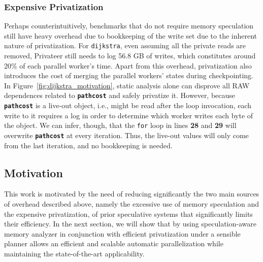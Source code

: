 \subsubsection{Expensive Privatization}
\label{sec:excessive-priv}
Perhaps counterintuitively, benchmarks that do not require memory
speculation still have heavy overhead due to bookkeeping of the write set
due to the inherent nature of privatization. For \texttt{dijkstra}, even
assuming all the private reads are removed, Privateer still needs to log
56.8 GB of writes, which constitutes around 20\% of each parallel worker's
time. Apart from this overhead, privatization also introduces the cost of
merging the parallel workers' states during checkpointing. In
Figure~\ref{fig:dijkstra_motivation}, static analysis alone can disprove
all RAW dependences related to \texttt{\textbf{pathcost}} and safely
privatize it. However, because \texttt{\textbf{pathcost}} is a live-out
object, i.e., might be read after the loop invocation, each write to it
requires a log in order to determine which worker writes each byte of the
object. We can infer, though, that the \texttt{for} loop in lines
\textbf{28} and \textbf{29} will overwrite \texttt{\textbf{pathcost}} at
every iteration. Thus, the live-out values will only come from the last
iteration, and no bookkeeping is needed.

\subsection{Motivation}
This work is motivated by the need of reducing significantly the two main
sources of overhead described above, namely the excessive use of memory
speculation and the expensive privatization, of prior speculative systems
that significantly limits their efficiency.
%
In the next section, we will show that by using speculation-aware memory
analyzer in conjunction with efficient privatization under a sensible
planner allows an efficient and scalable automatic parallelization while
maintaining the state-of-the-art applicability.



